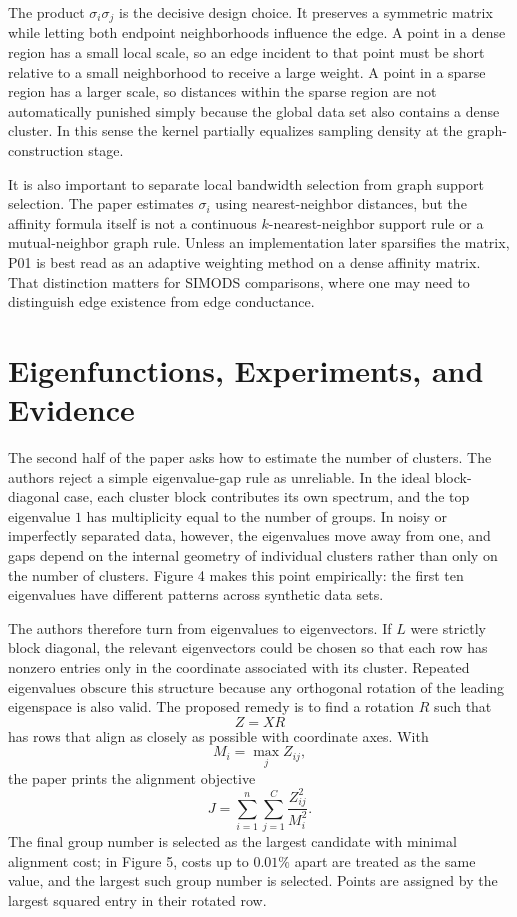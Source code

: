 \documentclass[11pt]{article}
\begin{document}
The product \(\sigma_i\sigma_j\) is the decisive design choice. It preserves a
symmetric matrix while letting both endpoint neighborhoods influence the edge.
A point in a dense region has a small local scale, so an edge incident to that
point must be short relative to a small neighborhood to receive a large weight.
A point in a sparse region has a larger scale, so distances within the sparse
region are not automatically punished simply because the global data set also
contains a dense cluster. In this sense the kernel partially equalizes sampling
density at the graph-construction stage.

It is also important to separate local bandwidth selection from graph support
selection. The paper estimates \(\sigma_i\) using nearest-neighbor distances,
but the affinity formula itself is not a continuous \(k\)-nearest-neighbor
support rule or a mutual-neighbor graph rule. Unless an implementation later
sparsifies the matrix, P01 is best read as an adaptive weighting method on a
dense affinity matrix. That distinction matters for SIMODS comparisons, where
one may need to distinguish edge existence from edge conductance.

\section{Eigenfunctions, Experiments, and Evidence}

The second half of the paper asks how to estimate the number of clusters. The
authors reject a simple eigenvalue-gap rule as unreliable. In the ideal
block-diagonal case, each cluster block contributes its own spectrum, and the
top eigenvalue \(1\) has multiplicity equal to the number of groups. In noisy
or imperfectly separated data, however, the eigenvalues move away from one,
and gaps depend on the internal geometry of individual clusters rather than
only on the number of clusters. Figure 4 makes this point empirically: the
first ten eigenvalues have different patterns across synthetic data sets.

The authors therefore turn from eigenvalues to eigenvectors. If \(L\) were
strictly block diagonal, the relevant eigenvectors could be chosen so that
each row has nonzero entries only in the coordinate associated with its
cluster. Repeated eigenvalues obscure this structure because any orthogonal
rotation of the leading eigenspace is also valid. The proposed remedy is to
find a rotation \(R\) such that
\[
  Z = X R
\]
has rows that align as closely as possible with coordinate axes. With
\[
  M_i = \max_j Z_{ij},
\]
the paper prints the alignment objective
\[
  J = \sum_{i=1}^n \sum_{j=1}^C \frac{Z_{ij}^2}{M_i^2}.
\]
The final group number is selected as the largest candidate with minimal
alignment cost; in Figure 5, costs up to \(0.01\%\) apart are treated as the
same value, and the largest such group number is selected. Points are assigned
by the largest squared entry in their rotated row.
\end{document}
